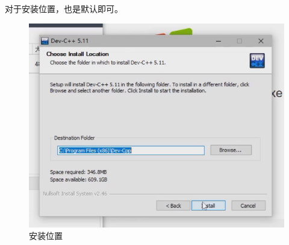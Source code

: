 对于安装位置，也是默认即可。
\begin{figure}[H]
\centering
\includegraphics[width=0.6\linewidth]{01chapter/img/dev安装05}
\caption{安装位置}
\label{fig:dev05}
\end{figure}

